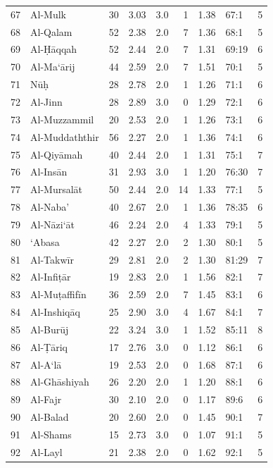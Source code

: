 \documentclass[11pt,a4paper]{article}
\begin{document}
\begin{table}[h]
\begin{minipage}[t]{0.48\textwidth}
\begin{tabular}{rl r r r r r lr}
67 & Al-Mulk & 30 & 3.03 & 3.0 & 1 & 1.38 & 67:1 & 5 \\
68 & Al-Qalam & 52 & 2.38 & 2.0 & 7 & 1.36 & 68:1 & 5 \\
69 & Al-\d{H}\=aqqah & 52 & 2.44 & 2.0 & 7 & 1.31 & 69:19 & 6 \\
70 & Al-Ma`\=arij & 44 & 2.59 & 2.0 & 7 & 1.51 & 70:1 & 5 \\
71 & N\=u\d{h} & 28 & 2.78 & 2.0 & 1 & 1.26 & 71:1 & 6 \\
72 & Al-Jinn & 28 & 2.89 & 3.0 & 0 & 1.29 & 72:1 & 6 \\
73 & Al-Muzzammil & 20 & 2.53 & 2.0 & 1 & 1.26 & 73:1 & 6 \\
74 & Al-Muddaththir & 56 & 2.27 & 2.0 & 1 & 1.36 & 74:1 & 6 \\
75 & Al-Qiy\=amah & 40 & 2.44 & 2.0 & 1 & 1.31 & 75:1 & 7 \\
76 & Al-Ins\=an & 31 & 2.93 & 3.0 & 1 & 1.20 & 76:30 & 7 \\
77 & Al-Mursal\=at & 50 & 2.44 & 2.0 & 14 & 1.33 & 77:1 & 5 \\
78 & Al-Naba' & 40 & 2.67 & 2.0 & 1 & 1.36 & 78:35 & 6 \\
79 & Al-N\=azi`\=at & 46 & 2.24 & 2.0 & 4 & 1.33 & 79:1 & 5 \\
80 & `Abasa & 42 & 2.27 & 2.0 & 2 & 1.30 & 80:1 & 5 \\
81 & Al-Takw\=ir & 29 & 2.81 & 2.0 & 2 & 1.30 & 81:29 & 7 \\
82 & Al-Infi\d{t}\=ar & 19 & 2.83 & 2.0 & 1 & 1.56 & 82:1 & 7 \\
83 & Al-Mu\d{t}affif\=in & 36 & 2.59 & 2.0 & 7 & 1.45 & 83:1 & 6 \\
84 & Al-Inshiq\=aq & 25 & 2.90 & 3.0 & 4 & 1.67 & 84:1 & 7 \\
85 & Al-Bur\=uj & 22 & 3.24 & 3.0 & 1 & 1.52 & 85:11 & 8 \\
86 & Al-\d{T}\=ariq & 17 & 2.76 & 3.0 & 0 & 1.12 & 86:1 & 6 \\
87 & Al-A`l\=a & 19 & 2.53 & 2.0 & 0 & 1.68 & 87:1 & 6 \\
88 & Al-Gh\=ashiyah & 26 & 2.20 & 2.0 & 1 & 1.20 & 88:1 & 6 \\
89 & Al-Fajr & 30 & 2.10 & 2.0 & 0 & 1.17 & 89:6 & 6 \\
90 & Al-Balad & 20 & 2.60 & 2.0 & 0 & 1.45 & 90:1 & 7 \\
91 & Al-Shams & 15 & 2.73 & 3.0 & 0 & 1.07 & 91:1 & 5 \\
92 & Al-Layl & 21 & 2.38 & 2.0 & 0 & 1.62 & 92:1 & 5 \\

\end{tabular}
\end{minipage}
\end{table}
\end{document}
